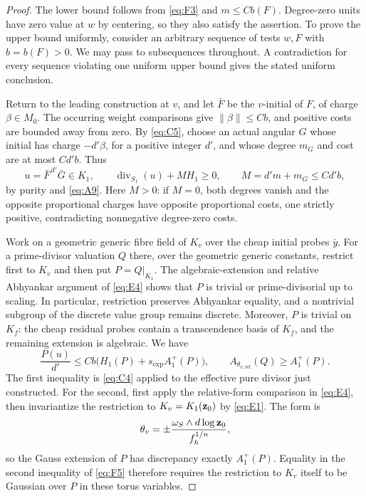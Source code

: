 \begin{proof}
The lower bound follows from \eqref{eq:F3} and $m\le Cb(F)$.
Degree-zero units have zero value at $w$ by centering, so they
also satisfy the assertion.  To prove the upper bound uniformly,
consider an arbitrary sequence of tests $w,F$ with $b=b(F)>0$.
We may pass to subsequences throughout.  A contradiction for every
sequence violating one uniform upper bound gives the stated
uniform conclusion.

Return to the leading construction at $v$, and let $\bar F$ be
the $v$-initial of $F$, of charge $\beta\in M_0$.  The occurring
weight comparisons give $\|\beta\|\le Cb$, and positive costs
are bounded away from zero.  By \eqref{eq:C5}, choose an actual
angular $G$ whose initial has charge $-d'\beta$, for a positive
integer $d'$, and whose degree $m_G$ and cost are at most $Cd'b$.
Thus
\[
 u=\bar F^{\,d'}\bar G\in K_1,\qquad
 \operatorname{div}_{S_1}(u)+MH_1\ge0,\qquad
 M=d'm+m_G\le Cd'b,
\]
by purity and \eqref{eq:A9}.  Here $M>0$: if $M=0$, both degrees
vanish and the opposite proportional charges have opposite
proportional costs, one strictly positive, contradicting
nonnegative degree-zero costs.

Work on a geometric generic fibre field of $K_v$ over the cheap
initial probes $\bar y$.  For a prime-divisor valuation $Q$ there,
over the geometric generic constants, restrict first to $K_v$ and
then put $P=Q|_{K_1}$.  The algebraic-extension and relative
Abhyankar argument of \eqref{eq:E4} shows that $P$ is trivial or
prime-divisorial up to scaling.  In particular, restriction
preserves Abhyankar equality, and a nontrivial subgroup of the
discrete value group remains discrete.  Moreover, $P$ is trivial
on $K_f$: the cheap residual probes contain a transcendence basis
of $K_f$, and the remaining extension is algebraic.  We have
\begin{equation}\label{eq:F5}
 \frac{P(u)}{d'}
       \le Cb\bigl(H_1(P)+s_{\exp}A_1^+(P)\bigr),
 \qquad
             A_{\theta_{v,\mathrm{rel}}}(Q)\ge A_1^+(P).
\end{equation}
The first inequality is \eqref{eq:C4} applied to the effective
pure divisor just constructed.  For the second, first apply the
relative-form comparison in \eqref{eq:E4}, then invariantize the
restriction to $K_v=K_1({\bf z}_0)$ by \eqref{eq:E1}.  The form is
\[
       \theta_v=\pm\frac{\omega_S\wedge d\log{\bf z}_0}
                              {f_h^{1/n}},
\]
so the Gauss extension of $P$ has discrepancy exactly $A_1^+(P)$.
Equality in the second inequality of \eqref{eq:F5} therefore
requires the restriction to $K_v$ itself to be Gaussian over $P$
in these torus variables.


\end{proof}
